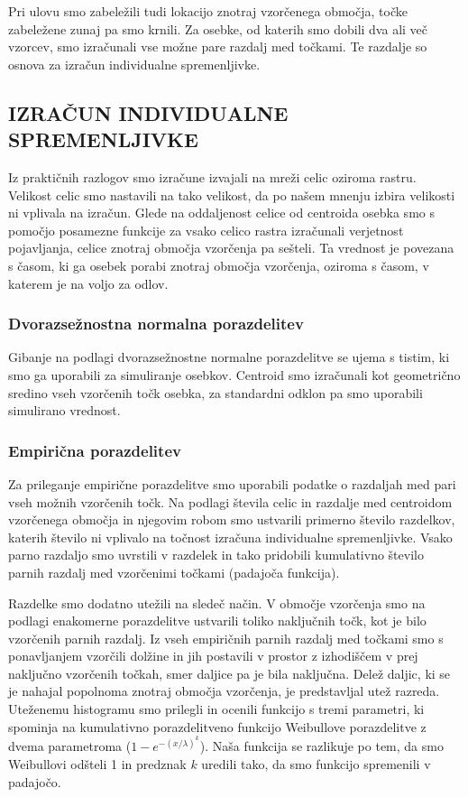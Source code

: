 Pri ulovu smo zabeležili tudi lokacijo znotraj vzorčenega območja, točke zabeležene zunaj pa smo krnili. Za osebke, od katerih smo dobili dva ali več vzorcev, smo izračunali vse možne pare razdalj med točkami. Te razdalje so osnova za izračun individualne spremenljivke.

\subsection{IZRAČUN INDIVIDUALNE SPREMENLJIVKE}
Iz praktičnih razlogov smo izračune izvajali na mreži celic oziroma rastru. Velikost celic smo nastavili na tako velikost, da po našem mnenju izbira velikosti ni vplivala na izračun. Glede na oddaljenost celice od centroida osebka smo s pomočjo posamezne funkcije za vsako celico rastra izračunali verjetnost pojavljanja, celice znotraj območja vzorčenja pa sešteli. Ta vrednost je povezana s časom, ki ga osebek porabi znotraj območja vzorčenja, oziroma s časom, v katerem je na voljo za odlov.

\subsubsection[\bfseries Dvorazsežnostna normalna porazdelitev]{Dvorazsežnostna normalna porazdelitev}
Gibanje na podlagi dvorazsežnostne normalne porazdelitve se ujema s tistim, ki smo ga uporabili za simuliranje osebkov. Centroid smo izračunali kot geometrično sredino vseh vzorčenih točk osebka, za standardni odklon pa smo uporabili simulirano vrednost.

\subsubsection[\bfseries Empirična porazdelitev]{Empirična porazdelitev}
Za prileganje empirične porazdelitve smo uporabili podatke o razdaljah med pari vseh možnih vzorčenih točk. Na podlagi števila celic in razdalje med centroidom vzorčenega območja in njegovim robom smo ustvarili primerno število razdelkov, katerih število ni vplivalo na točnost izračuna individualne spremenljivke. Vsako parno razdaljo smo uvrstili v razdelek in tako pridobili kumulativno število parnih razdalj med vzorčenimi točkami (padajoča funkcija).

Razdelke smo dodatno utežili na sledeč način. V območje vzorčenja smo na podlagi enakomerne porazdelitve ustvarili toliko naključnih točk, kot je bilo vzorčenih parnih razdalj. Iz vseh empiričnih parnih razdalj med točkami smo s ponavljanjem vzorčili dolžine in jih postavili v prostor z izhodiščem v prej naključno vzorčenih točkah, smer daljice pa je bila naključna. Delež daljic, ki se je nahajal popolnoma znotraj območja vzorčenja, je predstavljal utež razreda. Uteženemu histogramu smo prilegli in ocenili funkcijo s tremi parametri, ki spominja na kumulativno porazdelitveno funkcijo Weibullove porazdelitve z dvema parametroma ($1 - e^{-(x/\lambda)^k}$). Naša funkcija se razlikuje po tem, da smo Weibullovi odšteli 1 in predznak $k$ uredili tako, da smo funkcijo spremenili v padajočo.

